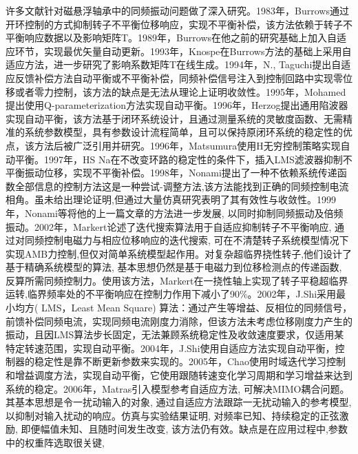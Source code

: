 许多文献针对磁悬浮轴承中的同频振动问题做了深入研究。1983年，Burrows通过开环控制的方式抑制转子不平衡位移响应，实现不平衡补偿，该方法依赖于转子不平衡响应数据以及影响矩阵T\cite{burrows1983vibration}。1989年，Burrows在他之前的研究基础上加入自适应环节，实现最优矢量自动更新\cite{burrows1989active}。1993年，Knospe在Burrows方法的基础上采用自适应方法，进一步研究了影响系数矩阵T在线生成\cite{knospe1993adaptive}。1994年，N., Taguchi提出自适应反馈补偿方法自动平衡或不平衡补偿，同频补偿信号注入到控制回路中实现零位移或者零力控制，该方法的缺点是无法从理论上证明收敛性\cite{taguchi1994unbalance}。1995年，Mohamed提出使用Q-parameterization方法实现自动平衡\cite{mohamed1995imbalance}。1996年，Herzog提出通用陷波器实现自动平衡，该方法基于闭环系统设计，且通过测量系统的灵敏度函数、无需精准的系统参数模型，具有参数设计流程简单，且可以保持原闭环系统的稳定性的优点，该方法后被广泛引用并研究\cite{herzog1996unbalance}。1996年，Matsumura使用H无穷控制策略实现自动平衡\cite{matsumura1996application}。1997年，HS Na在不改变环路的稳定性的条件下，插入LMS滤波器抑制不平衡振动位移，实现不平衡补偿\cite{na1997adaptive}。1998年，Nonami提出了一种不依赖系统传递函数全部信息的控制方法这是一种尝试-调整方法,该方法能找到正确的同频控制电流相角。虽未给出理论证明,但通过大量仿真研究表明了其有效性与收敛性\cite{nonami1998unbalance}。1999年，Nonami等将他的上一篇文章的方法进一步发展, 以同时抑制同频振动及倍频振动\cite{nonami1999adaptive}。2002年，Markert论述了迭代搜索算法用于自适应抑制转子不平衡响应, 通过对同频控制电磁力与相应位移响应的迭代搜索, 可在不清楚转子系统模型情况下实现AMB力控制,但仅对简单系统模型起作用。对复杂超临界挠性转子,他们设计了基于精确系统模型的算法, 基本思想仍然是基于电磁力到位移检测点的传递函数, 反算所需同频控制力。使用该方法，Markert在一挠性轴上实现了转子平稳超临界运转,临界频率处的不平衡响应在控制力作用下减小了90\%\cite{markert2002unbalance}。2002年，J.Shi采用最小均方( LMS，Least Mean Square) 算法：通过产生等增益、反相位的同频信号，前馈补偿同频电流，实现同频电流刚度力消除，但该方法未考虑位移刚度力产生的振动，且因LMS算法步长固定，无法兼顾系统稳定性及收敛速度要求，仅适用某特定转速范围，实现自动平衡\cite{shi2002direct}。2004年，J.Shi使用自适应方法实现自动平衡，控制器的稳定性是靠不断更新参数来实现的\cite{shi2004synchronous}。2005年，Chao使用时域迭代学习控制和增益调度方法，实现自动平衡，它使用跟随转速变化学习周期和学习增益来达到系统的稳定\cite{bi2005automatic}。2006年，Matras引入模型参考自适应方法, 可解决MIMO耦合问题。其基本思想是令一扰动输入的对象, 通过自适应方法跟踪一无扰动输入的参考模型, 以抑制对输入扰动的响应。仿真与实验结果证明, 对频率已知、持续稳定的正弦激励, 即便幅值未知、且随时间发生改变, 该方法仍有效。缺点是在应用过程中,参数中的权重阵选取很关键, 